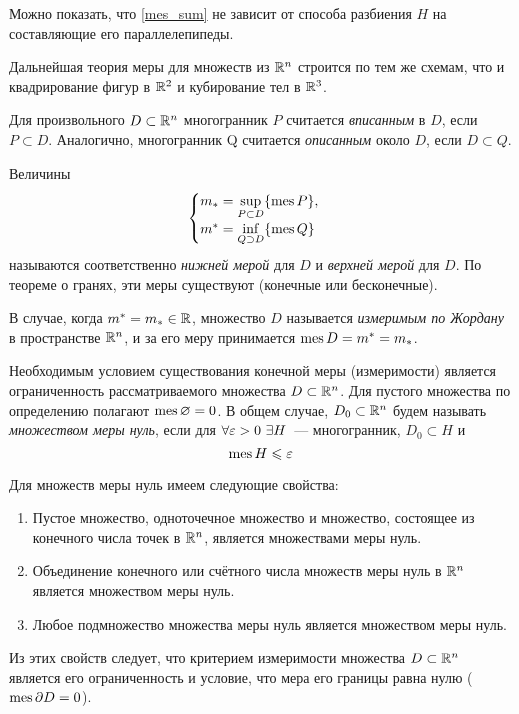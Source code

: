 \documentclass[../../main.tex]{subfiles}
\begin{document}
Можно показать, что \eqref{mes_sum} не зависит от способа разбиения $H$ 
на составляющие его параллелепипеды.

Дальнейшая теория меры для множеств из $\mathbb{R}^n$ строится по тем же
схемам, что и квадрирование фигур в $\mathbb{R}^2$ и кубирование тел в $\mathbb{R}^3$.

Для произвольного $D \subset \mathbb{R}^n$ многогранник $P$ 
считается \emph{вписанным} в $D$, 
если $P \subset D$. Аналогично, многогранник Q 
считается \emph{описанным} около $D$, если $D \subset Q$.

Величины
\begin{equation}
\begin{cases}
m_* = \underset{P \subset D}{\sup} \{ \operatorname{mes} P \}, \\
m^* = \underset{Q \supset D}{\inf} \{ \operatorname{mes} Q \}
\end{cases}
\end{equation}
называются соответственно \emph{нижней мерой} для $D$ и 
\emph{верхней мерой} для $D$.
По теореме о гранях, эти меры существуют (конечные или бесконечные).

В случае, когда $ m^* = m_* \in \mathbb{R}$,
множество $D$ называется \emph{измеримым по Жордану} в пространстве $\mathbb{R}^n$,
и за его меру принимается $\operatorname{mes} D = m^* = m_*$.

Необходимым условием существования конечной меры (измеримости) 
является ограниченность рассматриваемого множества $D \subset \mathbb{R}^n$. 
Для пустого множества по определению полагают $\operatorname{mes}\varnothing = 0$.
В общем случае, $D_0 \subset \mathbb{R}^n$ будем называть \emph{множеством меры нуль}, 
если для $\forall \varepsilon > 0\ \exists H$~--- многогранник, $D_0\subset H$ и
\begin{equation}
\label{614}
\operatorname{mes} H\leqslant\varepsilon
\end{equation}

Для множеств меры нуль имеем следующие свойства:
\begin{enumerate}
	\item Пустое множество, одноточечное множество и множество, 
	состоящее из конечного числа точек в $\mathbb{R}^n$, является множествами меры нуль.
	\item Объединение конечного или счётного числа множеств меры нуль 
	в $\mathbb{R}^n$ является множеством меры нуль.
	\item Любое подмножество множества меры нуль является множеством меры нуль.
\end{enumerate}

Из этих свойств следует, что критерием измеримости множества $D \subset \mathbb{R}^n$ 
является его ограниченность и условие, что мера его границы равна нулю
 ($ \operatorname{mes}\partial D = 0 $).
\end{document}
